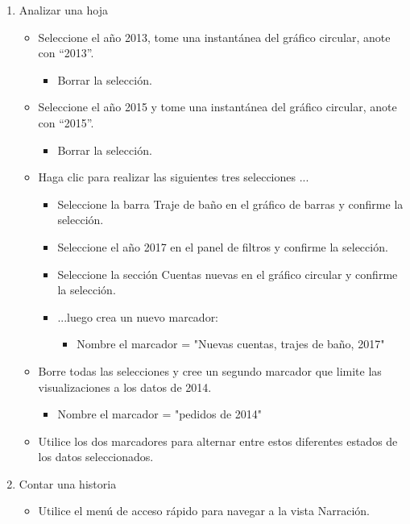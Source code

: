 \documentclass[12pt,letterpaper]{article}
\begin{document}
\begin{enumerate}
    \item Analizar una hoja
    \begin{itemize}  
        \item Seleccione el año 2013, tome una instantánea del gráfico circular, anote con “2013”.
        \begin{itemize}  
            \item Borrar la selección.
        \end{itemize} 
        \item Seleccione el año 2015 y tome una instantánea del gráfico circular, anote con “2015”.
        \begin{itemize}  
            \item Borrar la selección.
        \end{itemize} 
        \item Haga clic para realizar las siguientes tres selecciones ...
        \begin{itemize}  
            \item Seleccione la barra Traje de baño en el gráfico de barras y confirme la selección.
            \item Seleccione el año 2017 en el panel de filtros y confirme la selección.
            \item Seleccione la sección Cuentas nuevas en el gráfico circular y confirme la selección.
            \item ...luego crea un nuevo marcador:
            \begin{itemize}  
                \item Nombre el marcador = "Nuevas cuentas, trajes de baño, 2017"
            \end{itemize} 
        \end{itemize} 
        \item Borre todas las selecciones y cree un segundo marcador que limite las visualizaciones a los datos de 2014.
        \begin{itemize}  
            \item Nombre el marcador = "pedidos de 2014"
        \end{itemize}
        \item Utilice los dos marcadores para alternar entre estos diferentes estados de los datos seleccionados.
    \end{itemize} 
    \item Contar una historia
    \begin{itemize}  
        \item Utilice el menú de acceso rápido para navegar a la vista Narración.

\end{itemize}
\end{enumerate}
\end{document}
